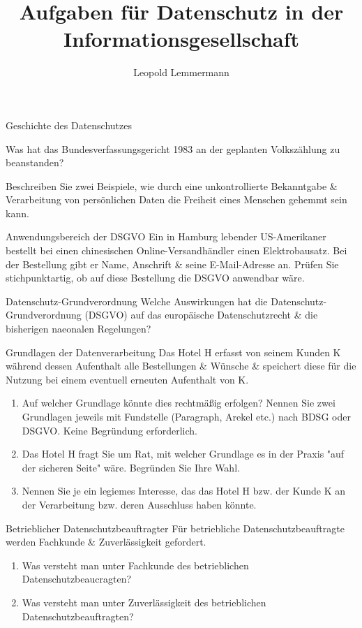 \documentclass{exercisesheet}
\title{Aufgaben für Datenschutz in der Informationsgesellschaft}
\author{Leopold Lemmermann}
\begin{document}
\createtitle

  \begin{exercise}{Geschichte des Datenschutzes}
      \item Was hat das Bundesverfassungsgericht 1983 an der geplanten Volkszählung zu beanstanden?
      \item Beschreiben Sie zwei Beispiele, wie durch eine unkontrollierte Bekanntgabe \& Verarbeitung von persönlichen Daten die Freiheit eines Menschen gehemmt sein kann.
  \end{exercise}

  \begin{exercise*}{Anwendungsbereich der DSGVO}
    Ein in Hamburg lebender US-Amerikaner bestellt bei einen chinesischen Online-Versandhändler einen Elektrobausatz. Bei der Bestellung gibt er Name, Anschrift \& seine E-Mail-Adresse an. Prüfen Sie stichpunktartig, ob auf diese Bestellung die DSGVO anwendbar wäre.
  \end{exercise*}

  \begin{exercise*}{Datenschutz-Grundverordnung}
    Welche Auswirkungen hat die Datenschutz-Grundverordnung (DSGVO) auf das europäische Datenschutzrecht \& die bisherigen naeonalen Regelungen?
  \end{exercise*}

  \begin{exercise*}{Grundlagen der Datenverarbeitung}
    Das Hotel H erfasst von seinem Kunden K während dessen Aufenthalt alle Bestellungen \& Wünsche \& speichert diese für die Nutzung bei einem eventuell erneuten Aufenthalt von K.
    \begin{enumerate}
      \item Auf welcher Grundlage könnte dies rechtmäßig erfolgen? Nennen Sie zwei Grundlagen jeweils mit Fundstelle (Paragraph, Arekel etc.) nach BDSG oder DSGVO. Keine Begründung erforderlich.
      \item Das Hotel H fragt Sie um Rat, mit welcher Grundlage es in der Praxis "auf der sicheren Seite" wäre. Begründen Sie Ihre Wahl.
      \item Nennen Sie je ein legiemes Interesse, das das Hotel H bzw. der Kunde K an der Verarbeitung bzw. deren Ausschluss haben könnte.
    \end{enumerate}
  \end{exercise*}

  \begin{exercise*}{Betrieblicher Datenschutzbeauftragter}
    Für betriebliche Datenschutzbeauftragte werden Fachkunde \& Zuverlässigkeit gefordert.
    \begin{enumerate}
      \item Was versteht man unter Fachkunde des betrieblichen Datenschutzbeaucragten?
      \item Was versteht man unter Zuverlässigkeit des betrieblichen Datenschutzbeauftragten?
    \end{enumerate}
  \end{exercise*}
\end{document}
